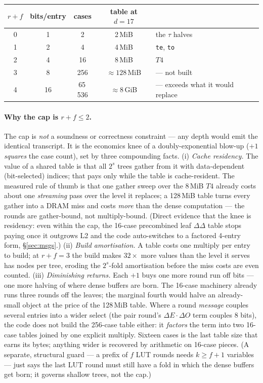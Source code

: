 \documentclass[11pt]{article}
\newcommand{\code}[1]{{\def\_{\textunderscore\allowbreak}\texttt{#1}}}
\theoremstyle{definition}
\begin{document}
\begin{center}
\small
\begin{tabular}{ccccl}
\toprule
$r + f$ & bits/entry & cases & table at $d = 17$ & \\
\midrule
0 & 1 & 2      & 2\,MiB  & the $\tau$ halves \\
1 & 2 & 4      & 4\,MiB  & \code{te}, \code{to} \\
2 & 4 & 16     & 8\,MiB  & $T4$ \\
3 & 8 & 256    & ${\approx}128$\,MiB & --- not built \\
4 & 16 & 65\,536 & ${\approx}8$\,GiB & --- exceeds what it would replace \\
\bottomrule
\end{tabular}
\end{center}

\paragraph{Why the cap is $r + f \le 2$.}
The cap is \emph{not} a soundness or correctness constraint --- any
depth would emit the identical transcript.  It is the economics knee of
a doubly-exponential blow-up ($+1$ \emph{squares} the case count), set
by three compounding facts.
(i) \emph{Cache residency.}  The value of a shared table is that all
$2^s$ trees gather from it with data-dependent (bit-selected) indices;
that pays only while the table is cache-resident.  The measured rule of
thumb is that one gather sweep over the 8\,MiB $T4$ already costs about
one \emph{streaming} pass over the level it replaces; a 128\,MiB table
turns every gather into a DRAM miss and costs \emph{more} than the dense
computation --- the rounds are gather-bound, not multiply-bound.  (Direct
evidence that the knee is residency: even within the cap, the 16-case
precombined leaf $\Delta\Delta$ table stops paying once it outgrows L2
and the code auto-switches to a factored 4-entry form, \S\ref{sec:msgs}.)
(ii) \emph{Build amortisation.}  A table costs one multiply per entry to
build; at $r{+}f = 3$ the build makes $32\times$ more values than the
level it serves has nodes per tree, eroding the $2^s$-fold amortisation
before the miss costs are even counted.
(iii) \emph{Diminishing returns.}  Each $+1$ buys one more round run off
bits --- one more halving of where dense buffers are born.  The 16-case
machinery already runs three rounds off the leaves; the marginal fourth
would halve an already-small object at the price of the 128\,MiB table.
Where a round \emph{message} couples several entries into a wider select
(the pair round's $\Delta E \cdot \Delta O$ term couples 8 bits), the
code does not build the 256-case table either: it \emph{factors} the
term into two 16-case tables joined by one explicit multiply.  Sixteen
cases is the last table size that earns its bytes; anything wider is
recovered by arithmetic on 16-case pieces.  (A separate, structural
guard --- a prefix of $f$ LUT rounds needs $k \ge f{+}1$ variables ---
just says the last LUT round must still have a fold in which the dense
buffers get born; it governs shallow trees, not the cap.)
\end{document}
